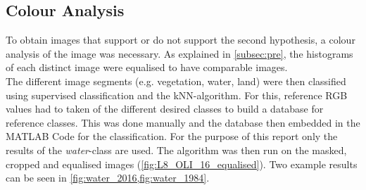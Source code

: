\subsection{Colour Analysis}
To obtain images that support or do not support the second hypothesis, a colour analysis of the image was necessary. As explained in \cref{subsec:pre}, the histograms of each distinct image were equalised to have comparable images.\\
The different image segments (e.g. vegetation, water, land) were then classified using supervised classification and the kNN-algorithm. For this, reference RGB values had to taken of the different desired classes to build a database for reference classes. This was done manually and the database then embedded in the MATLAB Code for the classification. For the purpose of this report only the results of the \textit{water}-class are used.
The algorithm was then run on the masked, cropped and equalised images (\cref{fig:L8_OLI_16_equalised}). Two example results can be seen in \cref{fig:water_2016,fig:water_1984}.

